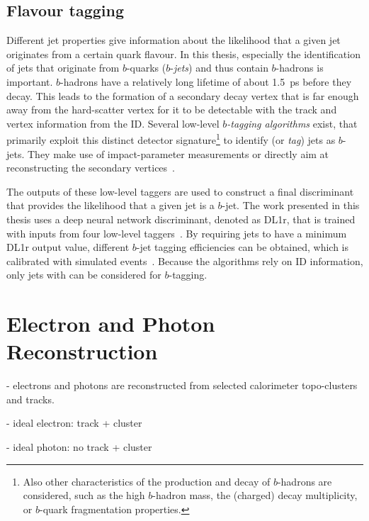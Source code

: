 \subsection{Flavour tagging}
Different jet properties give information about the likelihood that a given jet originates from a certain quark flavour. 
In this thesis, especially the identification of jets that originate from $b$-quarks ($b$-\emph{jets}) and thus contain $b$-hadrons is important. $b$-hadrons have a relatively long lifetime of about \SI{1.5}{\pico\second} before they decay. This leads to the formation of a secondary decay vertex that is far enough away from the hard-scatter vertex for it to be detectable with the track and vertex information from the ID. 
Several low-level \emph{$b$-tagging algorithms} exist, that primarily exploit this distinct detector signature\footnote{Also other characteristics of the production and decay of $b$-hadrons are considered, such as the high $b$-hadron mass, the (charged) decay multiplicity, or $b$-quark fragmentation properties.} to identify (or \emph{tag}) jets as $b$-jets. They make use of impact-parameter measurements or directly aim at reconstructing the secondary vertices~\cite{ATL-PHYS-PUB-2017-013}.

The outputs of these low-level taggers are used to construct a final discriminant that provides the likelihood that a given jet is a $b$-jet. The work presented in this thesis uses a deep neural network discriminant, denoted as DL1r, that is trained with inputs from four low-level taggers~\cite{ATL-PHYS-PUB-2017-013}.
By requiring jets to have a minimum DL1r output value, different $b$-jet tagging efficiencies can be obtained, which is calibrated with simulated \ttbar events~\cite{FTAG-2018-01}. 
Because the algorithms rely on ID information, only jets with  can be considered for $b$-tagging.



\section{Electron and Photon Reconstruction}
\label{sec:electron-photon-reconstruction}

- electrons and photons are reconstructed from selected calorimeter topo-clusters and tracks.

- ideal electron: track + cluster

- ideal photon: no track + cluster

